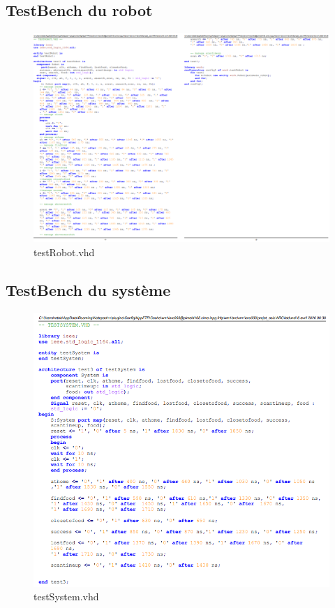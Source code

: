 \documentclass{article}
\begin{document}
\begin{landscape}
\newpage

\subsection{TestBench du robot}
\begin{figure}[!h]
\centering

\includegraphics[scale=0.75]{testrobot.PNG}
\caption{testRobot.vhd}
\end{figure} 

\newpage

\subsection{TestBench du système}
\begin{figure}[!h]
\centering

\includegraphics[scale=0.78]{testSystem.PNG}
\caption{testSystem.vhd}
\end{figure} 






\restoregeometry
\end{landscape}
\end{document}
